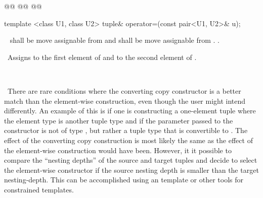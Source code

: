 \documentclass[american,twoside]{book}
\begin{document}
%
%
\begin{itemdecl}
@@
  @@ 
  @@
\end{itemdecl}

\begin{itemdescr}
\pnum
{}

\pnum
{}

\pnum
{}
\end{itemdescr}

%
%
%
\begin{itemdecl}
template <class U1, class U2> tuple& operator=(const pair<U1, U2>& u);
\end{itemdecl}

\begin{itemdescr}
\pnum
\requires\   shall be move assignable from  and
shall be move assignable from .
.

\pnum
\effects\  Assigns  to the first element of 
and  to the second element of .

\pnum
\returns\  

\pnum
\enternote\ There are rare conditions where the
  converting copy constructor is a better match than the element-wise
  construction, even though the user might intend differently.  An
  example of this is if one is constructing a one-element tuple where
  the element type is another tuple type  and if the parameter
  passed to the constructor is not of type , but rather a tuple
  type that is convertible to .  The effect of the converting copy
  construction is most likely the same as the effect of the
  element-wise construction would have been.  However, it it possible
  to compare the ``nesting depths'' of the source and target tuples and
  decide to select the element-wise constructor if the source nesting
  depth is smaller than the target nesting-depth.  This can be
  accomplished using an  template or other tools for
  constrained templates.  
\exitnote\
\end{itemdescr}
\end{document}
